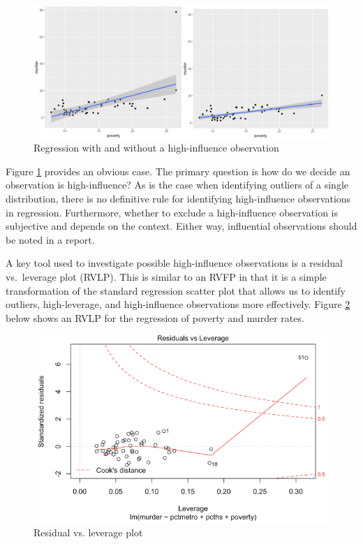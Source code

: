 \documentclass[
]{book}
\begin{document}
\begin{figure}

{\centering \includegraphics[width=\textwidth]{images/influential} 

}

\caption{Regression with and without a high-influence observation}\label{fig:influential}
\end{figure}

Figure \ref{fig:influential} provides an obvious case. The primary question is how do we decide an observation is high-influence? As is the case when identifying outliers of a single distribution, there is no definitive rule for identifying high-influence observations in regression. Furthermore, whether to exclude a high-influence observation is subjective and depends on the context. Either way, influential observations should be noted in a report.

A key tool used to investigate possible high-influence observations is a residual vs.~leverage plot (RVLP). This is similar to an RVFP in that it is a simple transformation of the standard regression scatter plot that allows us to identify outliers, high-leverage, and high-influence observations more effectively. Figure \ref{fig:rvlp} below shows an RVLP for the regression of poverty and murder rates.

\begin{figure}

{\centering \includegraphics[width=\textwidth]{images/rvlp} 

}

\caption{Residual vs. leverage plot}\label{fig:rvlp}
\end{figure}
\end{document}
